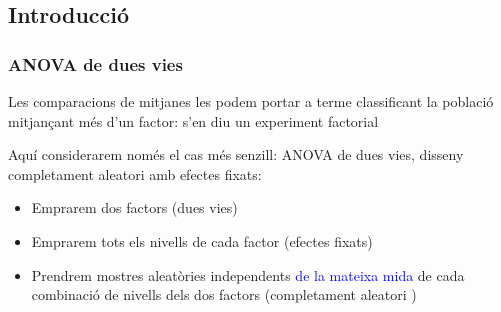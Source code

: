 \documentclass[12pt,t]{beamer}
\newcommand{\blue}[1]{\textcolor{blue}{#1}}
\renewcommand{\emph}[1]{{\color{red}#1}}
\theoremstyle{plain}
\theoremstyle{definition}
\begin{document}
\subsection{Introducció}
\begin{frame}
\frametitle{ANOVA de dues vies}

Les comparacions de mitjanes les podem portar a terme classificant la població mitjançant més d'un factor: s'en diu un \emph{experiment factorial}
\medskip

Aquí considerarem només el  cas més senzill: \emph{ANOVA de dues vies, disseny
completament aleatori amb efectes fixats}:
\begin{itemize}
\item Emprarem dos factors (\emph{dues vies})
\medskip

\item Emprarem tots els nivells de cada factor (\emph{efectes fixats})
\medskip

\item Prendrem mostres aleatòries independents \blue{de la mateixa mida} de cada combinació de nivells dels dos factors (\emph{completament aleatori })
\end{itemize}
\end{frame}
\end{document}
